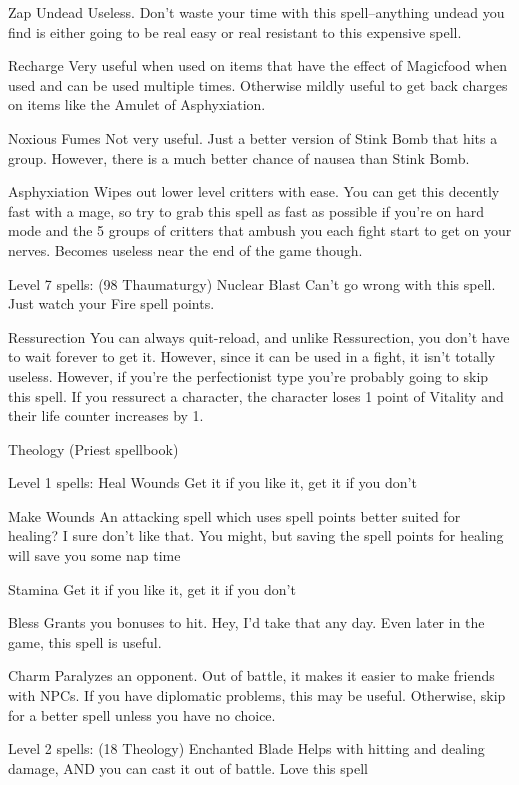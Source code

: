 \documentclass[12pt]{article}
\begin{document}
Zap Undead Useless. Don't waste your time with this spell--anything
undead you find is either going to be real easy or real resistant to
this expensive spell.

Recharge Very useful when used on items that have the effect of
Magicfood when used and can be used multiple times. Otherwise mildly
useful to get back charges on items like the Amulet of Asphyxiation.

Noxious Fumes Not very useful. Just a better version of Stink Bomb that
hits a group. However, there is a much better chance of nausea than
Stink Bomb.

Asphyxiation Wipes out lower level critters with ease. You can get this
decently fast with a mage, so try to grab this spell as fast as possible
if you're on hard mode and the 5 groups of critters that ambush you each
fight start to get on your nerves. Becomes useless near the end of the
game though.

Level 7 spells: (98 Thaumaturgy) Nuclear Blast Can't go wrong with this
spell. Just watch your Fire spell points.

Ressurection You can always quit-reload, and unlike Ressurection, you
don't have to wait forever to get it. However, since it can be used in a
fight, it isn't totally useless. However, if you're the perfectionist
type you're probably going to skip this spell. If you ressurect a
character, the character loses 1 point of Vitality and their life
counter increases by 1.

Theology (Priest spellbook)

Level 1 spells: Heal Wounds Get it if you like it, get it if you don't

Make Wounds An attacking spell which uses spell points better suited for
healing? I sure don't like that. You might, but saving the spell points
for healing will save you some nap time

Stamina Get it if you like it, get it if you don't

Bless Grants you bonuses to hit. Hey, I'd take that any day. Even later
in the game, this spell is useful.

Charm Paralyzes an opponent. Out of battle, it makes it easier to make
friends with NPCs. If you have diplomatic problems, this may be useful.
Otherwise, skip for a better spell unless you have no choice.

Level 2 spells: (18 Theology) Enchanted Blade Helps with hitting and
dealing damage, AND you can cast it out of battle. Love this spell
\end{document}
